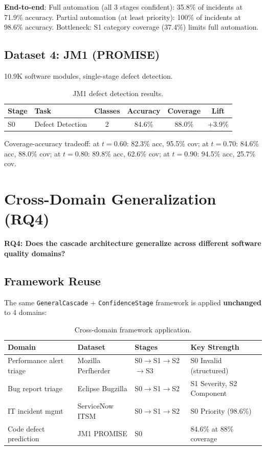 \documentclass[11pt]{article}
\begin{document}
\textbf{End-to-end}: Full automation (all 3 stages confident): 35.8\% of incidents at 71.9\% accuracy. Partial automation (at least priority): 100\% of incidents at 98.6\% accuracy. Bottleneck: S1 category coverage (37.4\%) limits full automation.

\subsection{Dataset 4: JM1 (PROMISE)}

10.9K software modules, single-stage defect detection.

\begin{table}[h]
\centering
\caption{JM1 defect detection results.}
\label{tab:jm1-cascade}
\begin{tabular}{llcccc}
\toprule
\textbf{Stage} & \textbf{Task} & \textbf{Classes} & \textbf{Accuracy} & \textbf{Coverage} & \textbf{Lift} \\
\midrule
S0 & Defect Detection & 2 & 84.6\% & 88.0\% & +3.9\% \\
\bottomrule
\end{tabular}
\end{table}

Coverage-accuracy tradeoff: at $t=0.60$: 82.3\% acc, 95.5\% cov; at $t=0.70$: 84.6\% acc, 88.0\% cov; at $t=0.80$: 89.8\% acc, 62.6\% cov; at $t=0.90$: 94.5\% acc, 25.7\% cov.

\section{Cross-Domain Generalization (RQ4)}
\label{sec:rq4}

\textbf{RQ4: Does the cascade architecture generalize across different software quality domains?}

\subsection{Framework Reuse}

The same \texttt{GeneralCascade} + \texttt{ConfidenceStage} framework is applied \textbf{unchanged} to 4 domains:

\begin{table}[h]
\centering
\caption{Cross-domain framework application.}
\label{tab:cross-domain}
\begin{tabular}{p{3cm}lll}
\toprule
\textbf{Domain} & \textbf{Dataset} & \textbf{Stages} & \textbf{Key Strength} \\
\midrule
Performance alert triage & Mozilla Perfherder & S0$\rightarrow$S1$\rightarrow$S2$\rightarrow$S3 & S0 Invalid (structured) \\
Bug report triage & Eclipse Bugzilla & S0$\rightarrow$S1$\rightarrow$S2 & S1 Severity, S2 Component \\
IT incident mgmt & ServiceNow ITSM & S0$\rightarrow$S1$\rightarrow$S2 & S0 Priority (98.6\%) \\
Code defect prediction & JM1 PROMISE & S0 & 84.6\% at 88\% coverage \\
\bottomrule
\end{tabular}
\end{table}
\end{document}
